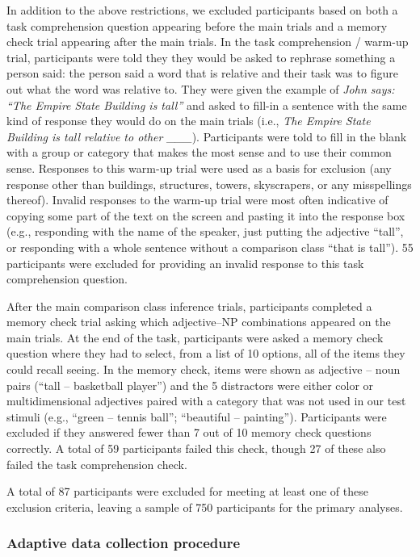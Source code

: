 \documentclass[doc]{apa6}
\begin{document}
In addition to the above restrictions, we excluded participants based on both a task comprehension question appearing before the main trials and a memory check trial appearing after the main trials. 
In the task comprehension / warm-up trial, participants were told they they would be asked to rephrase something a person said:  the person said a word that is relative and their task was to figure out what the word was relative to. They were given the example of \emph{John says: ``The Empire State Building is tall''} and asked to fill-in a sentence with the same kind of response they would do on the main trials (i.e., \emph{The Empire State Building is tall relative to other \_\_\_}). Participants were told to fill in the blank with a group or category that makes the most sense and to use their common sense.
Responses to this warm-up trial were used as a basis for exclusion (any response other than buildings, structures, towers, skyscrapers, or any misspellings thereof). 
Invalid responses to the warm-up trial were most often indicative of copying some part of the text on the screen and pasting it into the response box (e.g., responding with the name of the speaker, just putting the adjective ``tall'', or responding with a whole sentence without a comparison class ``that is tall'').
55 participants were excluded for providing an invalid response to this task comprehension question. 

After the main comparison class inference trials, participants completed a memory check trial asking which adjective--NP combinations appeared on the main trials. 
At the end of the task, participants were asked a memory check question where they had to select, from a list of 10 options, all of the items they could recall seeing. In the memory check, items were shown as adjective -- noun pairs (``tall -- basketball player'') and the 5 distractors were either color or multidimensional adjectives paired with a category that was not used in our test stimuli (e.g., ``green -- tennis ball''; ``beautiful -- painting'').
Participants were excluded if they answered fewer than 7 out of 10 memory check questions correctly.
A total of 59 participants failed this check, though 27 of these also failed the task comprehension check. 

A total of 87 participants were excluded for meeting at least one of these exclusion criteria, leaving a sample of 750 participants for the primary analyses.

\subsubsection{Adaptive data collection procedure}
\end{document}
